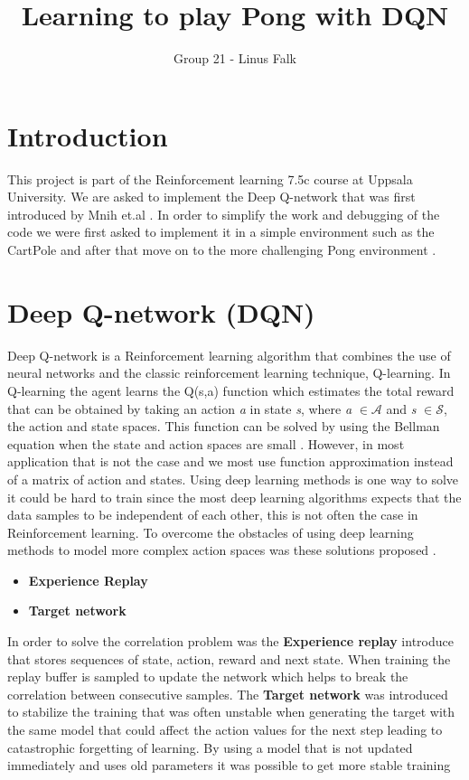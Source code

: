 \documentclass[a4paper,10pt]{article}
\title{Learning to play Pong with DQN}
\author{Group 21 - Linus Falk}
\begin{document}
\maketitle
\section{Introduction}
This project is part of the Reinforcement learning 7.5c course at Uppsala University. We are asked to implement the Deep Q-network that was first introduced by Mnih et.al \cite{dqn1}. In order to simplify the work and debugging of the code we were first asked to implement it in a simple environment such as the CartPole and after that move on to the more challenging Pong environment \cite{gym}.  

\section{Deep Q-network (DQN)}
Deep Q-network is a Reinforcement learning algorithm that combines the use of neural networks and the classic reinforcement learning technique, Q-learning. In Q-learning the agent learns the Q(s,a) function which estimates the total reward that can be obtained by taking an action \emph{a} in state \emph{s}, where \emph{a} $\in \mathcal{A}$ and \emph{s} $\in \mathcal{S}$, the action and state spaces. This function can be solved by using the Bellman equation when the state and action spaces are small \cite{sutton}. However, in most application that is not the case and we most use function approximation instead of a matrix of action and states. Using deep learning methods is one way to solve it could be hard to train since the most deep learning algorithms expects that the data samples to be independent of each other, this is not often the case in Reinforcement learning. To overcome the obstacles of using deep learning methods to model more complex action spaces was these solutions proposed \cite{dqn1}.        


\begin{itemize}
	\item \textbf{Experience Replay}
	\item \textbf{Target network}
\end{itemize}

In order to solve the correlation problem was the \textbf{Experience replay} introduce that stores sequences of state, action, reward and next state. When training the replay buffer is sampled to update the network which helps to break the correlation between consecutive samples\cite{dqn1}. The \textbf{Target network} was introduced to stabilize the training that was often unstable when generating the target with the same model that could affect the action values for the next step leading to catastrophic forgetting of learning. By using a model that is not updated immediately and uses old parameters it was possible to get more stable training \cite{dqn2}    
\end{document}
